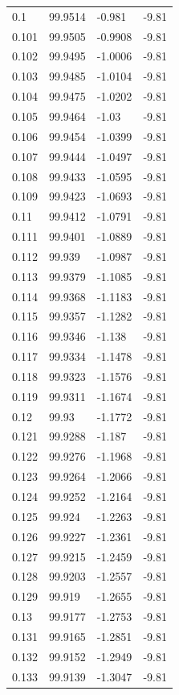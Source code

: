 \begin{tabular}{llll}
0.1 & 99.9514 & -0.981 & -9.81 \\
0.101 & 99.9505 & -0.9908 & -9.81 \\
0.102 & 99.9495 & -1.0006 & -9.81 \\
0.103 & 99.9485 & -1.0104 & -9.81 \\
0.104 & 99.9475 & -1.0202 & -9.81 \\
0.105 & 99.9464 & -1.03 & -9.81 \\
0.106 & 99.9454 & -1.0399 & -9.81 \\
0.107 & 99.9444 & -1.0497 & -9.81 \\
0.108 & 99.9433 & -1.0595 & -9.81 \\
0.109 & 99.9423 & -1.0693 & -9.81 \\
0.11 & 99.9412 & -1.0791 & -9.81 \\
0.111 & 99.9401 & -1.0889 & -9.81 \\
0.112 & 99.939 & -1.0987 & -9.81 \\
0.113 & 99.9379 & -1.1085 & -9.81 \\
0.114 & 99.9368 & -1.1183 & -9.81 \\
0.115 & 99.9357 & -1.1282 & -9.81 \\
0.116 & 99.9346 & -1.138 & -9.81 \\
0.117 & 99.9334 & -1.1478 & -9.81 \\
0.118 & 99.9323 & -1.1576 & -9.81 \\
0.119 & 99.9311 & -1.1674 & -9.81 \\
0.12 & 99.93 & -1.1772 & -9.81 \\
0.121 & 99.9288 & -1.187 & -9.81 \\
0.122 & 99.9276 & -1.1968 & -9.81 \\
0.123 & 99.9264 & -1.2066 & -9.81 \\
0.124 & 99.9252 & -1.2164 & -9.81 \\
0.125 & 99.924 & -1.2263 & -9.81 \\
0.126 & 99.9227 & -1.2361 & -9.81 \\
0.127 & 99.9215 & -1.2459 & -9.81 \\
0.128 & 99.9203 & -1.2557 & -9.81 \\
0.129 & 99.919 & -1.2655 & -9.81 \\
0.13 & 99.9177 & -1.2753 & -9.81 \\
0.131 & 99.9165 & -1.2851 & -9.81 \\
0.132 & 99.9152 & -1.2949 & -9.81 \\
0.133 & 99.9139 & -1.3047 & -9.81 \\

\end{tabular}
